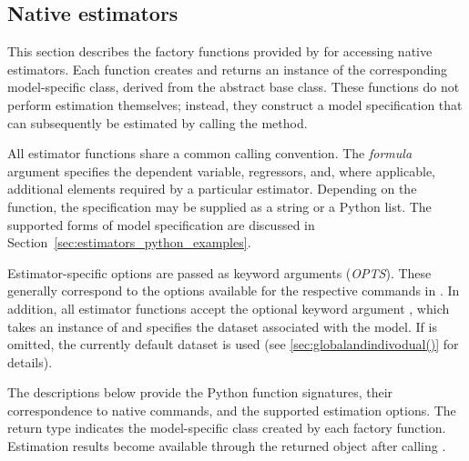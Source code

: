 \subsection{Native estimators}\label{sec:estimators_python}

This section describes the factory functions provided by
\gretlpy for accessing native \lgretl estimators. Each
function creates and returns an instance of the corresponding
model-specific class, derived from the abstract
\classpymodel base class. These functions do not perform
estimation themselves; instead, they construct a model
specification that can subsequently be estimated by calling
the  method.

All estimator functions share a common calling convention.
The \textit{formula} argument specifies the dependent
variable, regressors, and, where applicable, additional
elements required by a particular estimator. Depending on
the function, the specification may be supplied as a string
or a Python list. The supported forms of model specification
are discussed in Section~\ref{sec:estimators_python_examples}.

Estimator-specific options are passed as keyword arguments
(\textit{OPTS}). These generally correspond to the options
available for the respective commands in \lgretl. In addition,
all estimator functions accept the optional keyword argument
, which takes an instance of
\classpydataset and specifies the dataset associated with
the model. If  is omitted, the currently
default dataset is used (see \ref{sec:globalandindivodual()}
for details).

The descriptions below provide the Python function
signatures, their correspondence to native \lgretl commands,
and the supported estimation options. The return type
indicates the model-specific class created by each factory
function. Estimation results become available through the
returned object after calling .

